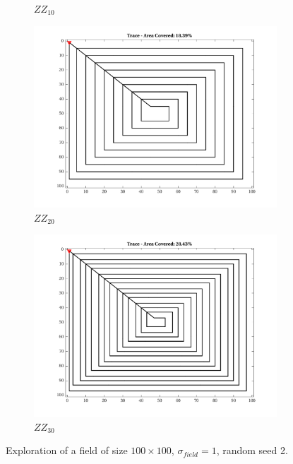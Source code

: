 \begin{figure}[htb!]
\begin{subfigure}[t]{0.3333\textwidth}
        \captionsetup{skip=0.20\baselineskip,size=footnotesize}
        \caption{$ZZ_{10}$}
    \end{subfigure}%
    \begin{subfigure}[t]{0.3333\textwidth}
        \centering
        \includegraphics[width=\linewidth]{figures/hbresults/path_zz_20p_100x100_sf_1_seed_2.png}
        \captionsetup{skip=0.20\baselineskip,size=footnotesize}
        \caption{$ZZ_{20}$}
    \end{subfigure}%
    \begin{subfigure}[t]{0.3333\textwidth}
        \centering
        \includegraphics[width=\linewidth]{figures/hbresults/path_zz_30p_100x100_sf_1_seed_2.png}
        \captionsetup{skip=0.20\baselineskip,size=footnotesize}
        \caption{$ZZ_{30}$}
    \end{subfigure}%
    \captionsetup{skip=0.20\baselineskip}
    \caption{Exploration of a field of size $100 \times 100$, $\sigma_{field} = 1$, random seed 2.}
    \label{fig:sf1}
\end{figure}


